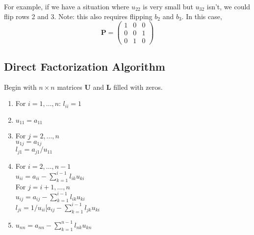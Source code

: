 \documentclass[12pt]{article}
\newcommand{\ve}[1]{\ensuremath{\mathbf{#1}}}
\begin{document}
For example, if we have a situation where $u_{22}$ is very small but $u_{32}$ isn't, we could flip rows 2 and 3. Note: this also requires flipping $b_2$ and $b_3$. In this case, 
\[\ve{P} = \begin{pmatrix}
  1 & 0 & 0 \\
  0 & 0 & 1 \\
  0 & 1 & 0
\end{pmatrix} \]


\subsection*{Direct Factorization Algorithm}
Begin with $n \times n$ matrices $\ve{U}$ and $\ve{L}$ filled with zeros.
%
\begin{enumerate}
\item For $i = 1, \dots, n$: $l_{ii} = 1$
\item $u_{11} = a_{11}$

\item For $j = 2, \dots, n$\\
  \hspace*{1 em} $u_{1j} = a_{1j}$\\
  \hspace*{1 em} $l_{j1} = a_{j1}/u_{11}$
 
\item For $i = 2, \dots, n-1$\\
  \hspace*{1 em} $u_{ii} = a_{ii} - \sum_{k=1}^{i-1} l_{ik} u_{ki}$\\
  \hspace*{1 em} For $j = i+1, \dots, n$\\   
    \hspace*{3 em} $u_{ij} = a_{ij} - \sum_{k=1}^{i-1} l_{ik} u_{ki}$\\
    \hspace*{3 em} $l_{ji} = 1/u_{ii}[a_{ij} - \sum_{k=1}^{i-1} l_{jk} u_{ki}$
    
\item $u_{nn} = a_{nn} - \sum_{k=1}^{n-1} l_{nk} u_{kn}$
\end{enumerate}

\end{document}
